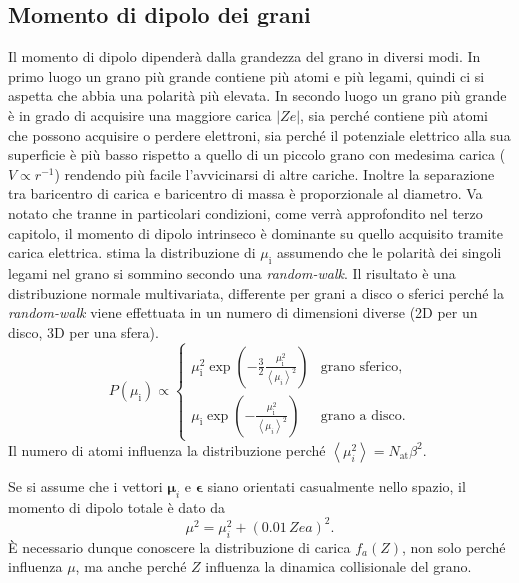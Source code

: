 \subsection{Momento di dipolo dei grani}
\label{dipolo}
Il momento di dipolo dipenderà dalla grandezza del grano in diversi modi. In primo luogo un grano più grande contiene più atomi e più legami, quindi ci si aspetta che abbia una polarità più elevata. In secondo luogo un grano più grande è in grado di acquisire una maggiore carica $|Ze|$, sia perché contiene più atomi che possono acquisire o perdere elettroni, sia perché il potenziale elettrico alla sua superficie è più basso rispetto a quello di un piccolo grano con medesima carica ($V\propto r^{-1}$) rendendo più facile l'avvicinarsi di altre cariche. Inoltre la separazione tra baricentro di carica e baricentro di massa è proporzionale al diametro. Va notato che tranne in particolari condizioni, come verrà approfondito nel terzo capitolo, il momento di dipolo intrinseco è dominante su quello acquisito tramite carica elettrica.
\textcite{Ali} stima la distribuzione di $\mu_{\mathrm{i}}$ assumendo che le polarità dei singoli legami nel grano si sommino secondo una \textit{random-walk}. Il risultato è una distribuzione normale multivariata, differente per grani a disco o sferici perché la \textit{random-walk} viene effettuata in un numero di dimensioni diverse (2D per un disco, 3D per una sfera).
\begin{equation}
\label{dip}
P(\mu_\mathrm{i})\propto
	\begin{cases}
		\mu_\mathrm{i}^{2} \exp \left(- \frac{3}{2} \frac{ \mu_\mathrm{i}^2}{ \left< \mu_{i} \right> ^2} \right) & \text{grano sferico},\\
		\mu_\mathrm{i} \exp \left(- \frac{ \mu_\mathrm{i}^2}{ \left< \mu_{i} \right> ^2} \right) & \text{grano a disco}.
	
	\end{cases}
\end{equation}
Il numero di atomi influenza la distribuzione perché $\left< \mu_{i}^2 \right>  = N_{\mathrm{at}} \beta^2$.

Se si assume che i vettori $\boldsymbol{\mu}_{i}$ e $\boldsymbol{\epsilon}$ siano orientati casualmente nello spazio, il momento di dipolo totale è dato da
\begin{equation}
\mu^2 = \mu^2_i + (0.01\,Zea)^2.
\end{equation}
È necessario dunque conoscere la distribuzione di carica $f_a(Z)$, non solo perché influenza $\mu$, ma anche perché $Z$ influenza la dinamica collisionale del grano.

